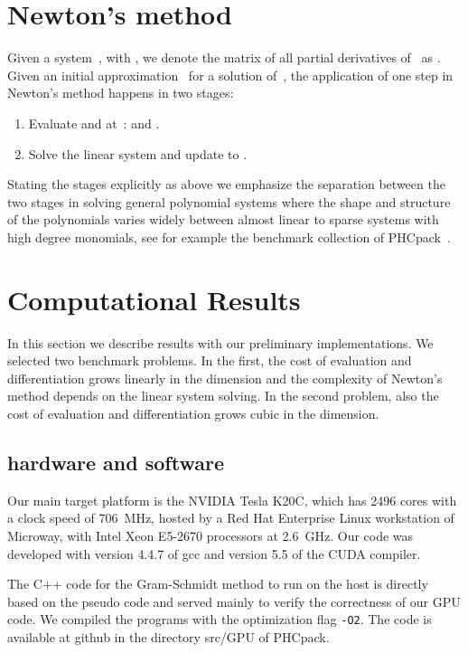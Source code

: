 \documentclass{article}
\begin{document}
\section{Newton's method}

Given a system~, with ,
we denote the matrix of all partial derivatives of~ as .
Given an initial approximation~ for a solution of~,
the application of one step in Newton's method happens in two stages:
\begin{enumerate}
\item Evaluate  and  at~:
       and .
\item Solve the linear system 
      and update  to .
\end{enumerate}
Stating the stages explicitly as above we emphasize the separation
between the two stages in solving general polynomial systems where
the shape and structure of the polynomials varies widely between
almost linear to sparse systems with high degree monomials,
see for example the benchmark collection of PHCpack~\cite{Ver99}.

\section{Computational Results}

In this section we describe results with our preliminary implementations.
We selected two benchmark problems.  In the first, the cost of evaluation
and differentiation grows linearly in the dimension and the complexity of
Newton's method depends on the linear system solving.
In the second problem, also the cost of evaluation and differentiation
grows cubic in the dimension.

\subsection{hardware and software}

Our main target platform is the NVIDIA Tesla K20C,
which has 2496 cores with a clock speed of 706~MHz,
hosted by a Red Hat Enterprise Linux workstation of Microway,
with Intel Xeon E5-2670 processors at 2.6~GHz.
Our code was developed with version 4.4.7 of gcc
and version 5.5 of the CUDA compiler.





The C++ code for the Gram-Schmidt method to run on the host is
directly based on the pseudo code and served mainly to verify
the correctness of our GPU code.
We compiled the programs with the optimization flag {\tt -O2}.
The code is available at github in the directory src/GPU
of PHCpack.
\end{document}
